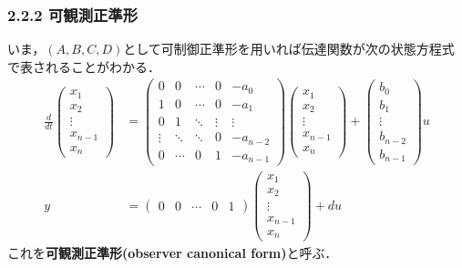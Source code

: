 \begin{frame}[t]
\frametitle{2.2.2 可観測正準形}


いま，$(A,B,C,D)$として可制御正準形を用いれば伝達関数が次の状態方程式で表されることがわかる．
\begin{align}
 \frac{d}{dt}
  \left(\begin{array}{c}
         x_1 \\
	 x_2 \\
	 \vdots \\
	 x_{n-1} \\
	 x_n
	\end{array}\right)
  &=
  \left(\begin{array}{ccccc}
     0      & 0      & \cdots & 0      & -a_0  \\
	 1      & 0      & \cdots & 0      & -a_1 \\
     0      & 1      & \ddots & \vdots & \vdots \\
	 \vdots & \ddots & \ddots & 0      & -a_{n-2} \\
	 0      & \cdots & 0      & 1      & -a_{n-1}
	\end{array}\right)
  \left(\begin{array}{c}
	 x_1 \\
	 x_2 \\
	 \vdots \\
	 x_{n-1} \\
	 x_n
	\end{array}\right)
  +
  \left(\begin{array}{c}
     b_0 \\
	 b_1 \\
	 \vdots \\
	 b_{n-2} \\
	 b_{n-1}
	\end{array}\right)
  u \label{eq:canoform_o}\\
y &=
 \left(\begin{array}{ccccc}
        0 & 0 & \cdots & 0 & 1
       \end{array}\right)
 \left(\begin{array}{c}
        x_1 \\
	x_2 \\
	\vdots \\
	x_{n-1} \\
	x_n
       \end{array}\right)
 + d u
\end{align}
これを{\bf {可観測正準形}(observer canonical form)}と呼ぶ．
\end{frame}


